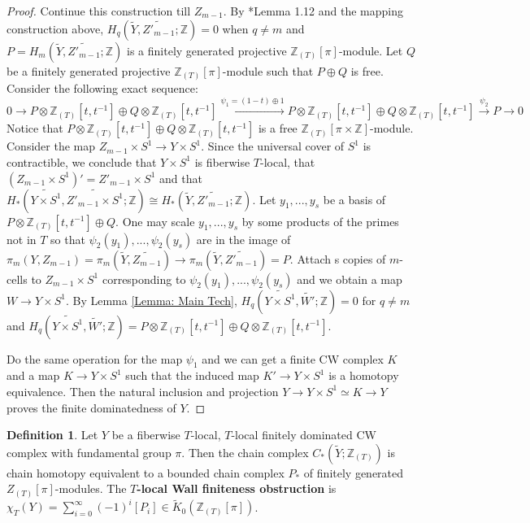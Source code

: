 \documentclass[11pt]{amsart}
\theoremstyle{definition}
\newtheorem{definition}[theorem]{Definition}
\numberwithin{equation}{section}
\numberwithin{equation}{section}
\newcommand\ZZ{\mathbb{Z}}
\begin{document}
\begin{proof}
Continue this construction till $Z_{m-1}$. By \cite{pedersen2017wallsfinitenessobstruction}*{Lemma 1.12} and the mapping construction above, $H_q(\widetilde{Y},\widetilde{Z'_{m-1}};\ZZ)=0$ when $q\neq m$ and $P=H_m(\widetilde{Y},\widetilde{Z'_{m-1}};\ZZ)$ is a finitely generated projective $\ZZ_{(T)}[\pi]$-module. Let $Q$ be a finitely generated projective $\ZZ_{(T)}[\pi]$-module such that $P\oplus Q$ is free. Consider the following exact sequence:
\[
0\rightarrow P\otimes \ZZ_{(T)}[t,t^{-1}]\oplus Q\otimes \ZZ_{(T)}[t,t^{-1}] \xrightarrow{\psi_1=(1-t)\oplus 1} P\otimes \ZZ_{(T)}[t,t^{-1}]\oplus Q\otimes \ZZ_{(T)}[t,t^{-1}] \xrightarrow{\psi_2} P\rightarrow 0
\]
Notice that $P\otimes \ZZ_{(T)}[t,t^{-1}]\oplus Q\otimes \ZZ_{(T)}[t,t^{-1}]$ is a free $\ZZ_{(T)}[\pi\times \ZZ]$-module. Consider the map $Z_{m-1}\times S^1\rightarrow Y\times S^1$. Since the universal cover of $S^1$ is contractible, we conclude that $Y\times S^1$ is fiberwise $T$-local, that $(Z_{m-1}\times S^1)'=Z'_{m-1}\times S^1$ and that $H_*(\widetilde{Y\times S^1},\widetilde{Z'_{m-1}\times S^1};\ZZ)\cong H_*(\widetilde{Y},\widetilde{Z'_{m-1}};\ZZ)$. Let $y_1,...,y_s$ be a basis of $P\otimes \ZZ_{(T)}[t,t^{-1}]\oplus Q$. One may scale $y_1,...,y_s$ by some products of the primes not in $T$ so that $\psi_2(y_1),...,\psi_2(y_s)$ are in the image of $\pi_m(Y,Z_{m-1})=\pi_m(\widetilde{Y},\widetilde{Z_{m-1}})\rightarrow \pi_m(\widetilde{Y},\widetilde{Z'_{m-1}})=P$. Attach s copies of $m$-cells to $Z_{m-1}\times S^1$ corresponding to $\psi_2(y_1),...,\psi_2(y_s)$ and we obtain a map $W\rightarrow Y\times S^1$. By Lemma \ref{Lemma: Main Tech}, $H_q(\widetilde{Y\times S^1},\widetilde{W'};\ZZ)=0$ for $q\neq m$ and $H_q(\widetilde{Y\times S^1},\widetilde{W'};\ZZ)=P\otimes \ZZ_{(T)}[t,t^{-1}]\oplus Q\otimes \ZZ_{(T)}[t,t^{-1}]$.

Do the same operation for the map $\psi_1$ and we can get a finite CW complex $K$ and a map $K\rightarrow Y\times S^1$ such that the induced map $K'\rightarrow Y\times S^1$ is a homotopy equivalence. Then the natural inclusion and projection $Y\rightarrow Y\times S^1\simeq K\rightarrow Y$ proves the finite dominatedness of $Y$.
\end{proof}

\begin{definition}\label{Def: local Wall obstruction}
Let $Y$ be a fiberwise $T$-local, $T$-local finitely dominated CW complex with fundamental group $\pi$. Then the chain complex $C_*(\widetilde{Y};\ZZ_{(T)})$ is chain homotopy equivalent to a bounded chain complex $P_*$ of finitely generated $Z_{(T)}[\pi]$-modules. The \textbf{$T$-local Wall finiteness obstruction} is $\chi_T(Y)=\sum_{i=0}^{\infty}(-1)^i[P_i]\in \widetilde{K}_0(\ZZ_{(T)}[\pi])$.
\end{definition}
\end{document}
